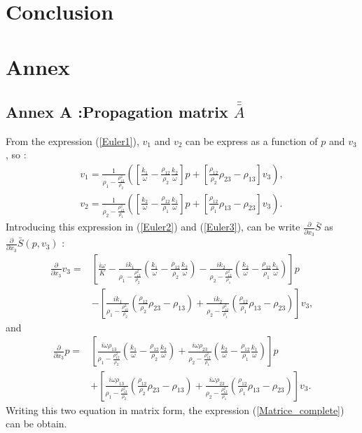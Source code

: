 \documentclass{article}
\begin{document}
\section{Conclusion}


\section{Annex}
\subsection*{Annex A :Propagation matrix $\bar{\bar{A}}$}
\label{Ann_A}	
From the expression (\ref{Euler1}), $v_1$ and $v_2$ can be express as a function of $p$ and $v_3$, so :
\begin{align*}
	v_1=\frac{1}{\rho_1-\frac{\rho_{12}^2}{\rho_2}}([\frac{k_1}{\omega}-\frac{\rho_{12}}{\rho_2}\frac{k_2}{\omega}]p+[\frac{\rho_{12}}{\rho_2}\rho_{23}-\rho_{13}]v_3), \\
	v_2=\frac{1}{\rho_2-\frac{\rho_{12}^2}{\rho_1}}([\frac{k_2}{\omega}-\frac{\rho_{12}}{\rho_1}\frac{k_1}{\omega}]p+[\frac{\rho_{12}}{\rho_1}\rho_{13}-\rho_{23}]v_3).
\end{align*}
 	Introducing this expression in (\ref{Euler2}) and (\ref{Euler3}), can be write $\frac{\partial}{\partial x_3}\bar{S}$ as $\frac{\partial}{\partial x_3}\bar{S}(p,v_3)$ :
    \begin{align*}
    \frac{\partial}{\partial x_3}v_3=&[\frac{i\omega}{K}-\frac{ik_1}{\rho_1-\frac{\rho_{12}^2}{\rho_2}}(\frac{k_1}{\omega}-\frac{\rho_{12}}{\rho_2}\frac{k_2}{\omega})-\frac{ik_2}{\rho_2-\frac{\rho_{12}^2}{\rho_1}}(\frac{k_2}{\omega}-\frac{\rho_{12}}{\rho_1}\frac{k_1}{\omega})]p\\
    &-[\frac{ik_1}{\rho_1-\frac{\rho_{12}^2}{\rho_2}}(\frac{\rho_{12}}{\rho_2}\rho_{23}-\rho_{13})+\frac{ik_2}{\rho_2-\frac{\rho_{12}^2}{\rho_1}}(\frac{\rho_{12}}{\rho_1}\rho_{13}-\rho_{23})]v_3,
    \end{align*}
    and 
    \begin{align*}
    \frac{\partial}{\partial x_3}p=&[\frac{i\omega \rho_{13}}{\rho_1-\frac{\rho_{12}^2}{\rho_2}}(\frac{k_1}{\omega}-\frac{\rho_{12}}{\rho_2}\frac{k_2}{\omega})+\frac{i\omega \rho_{23}}{\rho_2-\frac{\rho_{12}^2}{\rho_1}}(\frac{k_2}{\omega}-\frac{\rho_{12}}{\rho_1}\frac{k_1}{\omega})]p\\
    &+[\frac{i\omega \rho_{13}}{\rho_1-\frac{\rho_{12}^2}{\rho_2}}(\frac{\rho_{12}}{\rho_2}\rho_{23}-\rho_{13})+\frac{i\omega \rho_{23}}{\rho_2-\frac{\rho_{12}^2}{\rho_1}}(\frac{\rho_{12}}{\rho_1}\rho_{13}-\rho_{23})]v_3.
    \end{align*}
    Writing this two equation in matrix form, the expression (\ref{Matrice_complete}) can be obtain.
    
\end{document}
